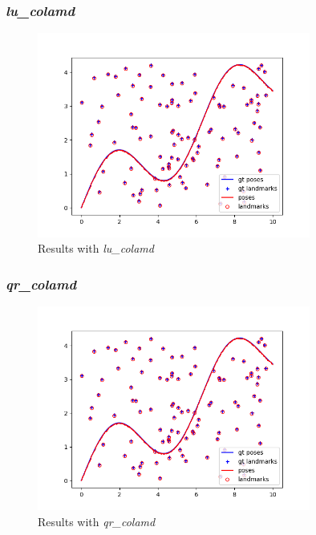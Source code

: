 \documentclass[12pt, a4paper]{article}
\begin{document}
\subsubsection{\textit{lu\_colamd}}
\begin{figure}[H]
  \centering
  \includegraphics[width=0.8\textwidth]{./results/linear/lu_colamd_2d_linear_map.png}
  \caption{Results with \textit{lu\_colamd}}
\end{figure}
\subsubsection{\textit{qr\_colamd}}
\begin{figure}[H]
  \centering
  \includegraphics[width=0.8\textwidth]{./results/linear/qr_colamd_2d_linear_map.png}
  \caption{Results with \textit{qr\_colamd}}
\end{figure}
\end{document}
